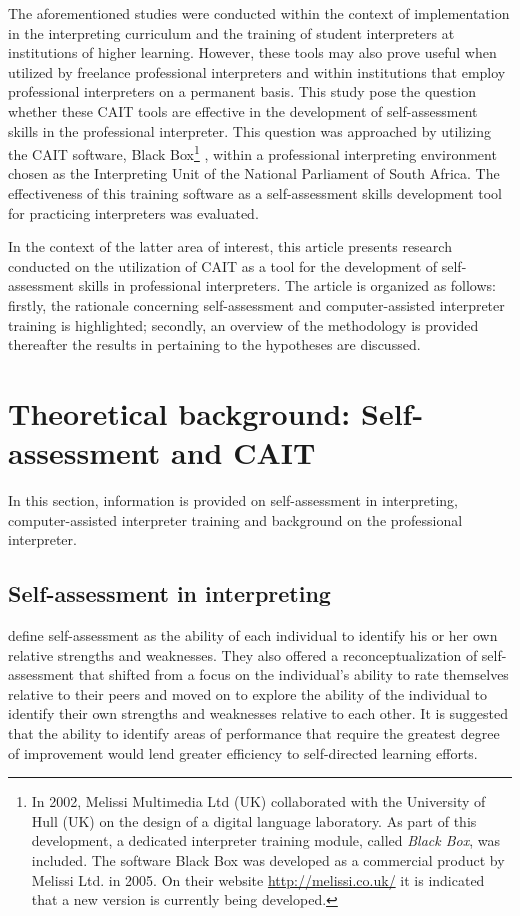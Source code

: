 \documentclass[output=paper]{langsci/langscibook}
\begin{document}
The aforementioned studies were conducted within the context of implementation in the interpreting curriculum and the training of student interpreters at institutions of higher learning. However, these tools may also prove useful when utilized by freelance professional interpreters and within institutions that employ professional interpreters on a permanent basis. This study pose the question whether these \textsc{CAIT} tools are effective in the development of self-assessment skills in the professional interpreter. This question was approached by utilizing the \textsc{CAIT} software, Black Box\footnote{In 2002, Melissi Multimedia Ltd (UK) collaborated with the University of Hull (UK) on the design of a digital language laboratory. As part of this development, a dedicated interpreter training module, called \textit{Black Box}, was included. The software Black Box was developed as a commercial product by Melissi Ltd. in 2005. On their website \url{http://melissi.co.uk/} it is indicated that a new version is currently being developed.} , within a professional interpreting environment chosen as the Interpreting Unit of the National Parliament of South Africa. The effectiveness of this training software as a self-assessment skills development tool for practicing interpreters was evaluated. 

In the context of the latter area of interest, this article presents research conducted on the utilization of \textsc{CAIT} as a tool for the development of self-assessment skills in professional interpreters. The article is organized as follows: firstly, the rationale concerning self-assessment and computer-assisted interpreter training is highlighted; secondly, an overview of the methodology is provided thereafter the results in pertaining to the hypotheses are discussed.

\section{Theoretical background: Self-assessment and \textsc{CAIT}}

In this section, information is provided on self-assessment in interpreting, computer-assisted interpreter training and background on the professional interpreter.

\subsection{Self-assessment in interpreting}

\citet[74]{Regehr1996} define self-assessment as the ability of each individual to identify his or her own relative strengths and weaknesses. They also offered a reconceptualization of self-assessment that shifted from a focus on the individual’s ability to rate themselves relative to their peers and moved on to explore the ability of the individual to identify their own strengths and weaknesses relative to each other. It is suggested that the ability to identify areas of performance that require the greatest degree of improvement would lend greater efficiency to self-directed learning efforts.
\end{document}
